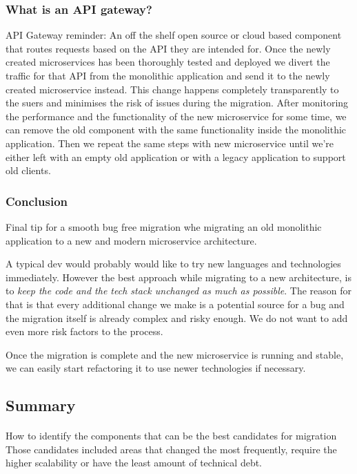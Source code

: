 \documentclass[a4paper, 11pt]{book}
\begin{document}
    \subsubsection{What is an API gateway?}
    API Gateway reminder: An off the shelf open source or cloud based component that routes requests based on the API they are intended for.
    Once the newly created microservices has been thoroughly tested and deployed we divert the traffic for that API from the monolithic application and send it to the newly created microservice instead.
    This change happens completely transparently to the suers and minimises the risk of issues during the migration.
    After monitoring the performance and the functionality of the new microservice for some time, we can remove the old component with the same functionality inside the monolithic application.
    Then we repeat the same steps with new microservice until we're either left with an empty old application or with a legacy application to support old clients.

    \subsubsection{Conclusion}
    Final tip for a smooth bug free migration whe migrating an old monolithic application to a new and modern microservice architecture.

    A typical dev would probably would like to try new languages and technologies immediately.
    However the best approach while migrating to a new architecture, is to \textit{keep the code and the tech stack unchanged as much as possible}.
    The reason for that is that every additional change we make is a potential source for a bug and the migration itself is already complex and risky enough.
    We do not want to add even more risk factors to the process.

    Once the migration is complete and the new microservice is running and stable, we can easily start refactoring it to use newer technologies if necessary.

    \subsection{Summary}

    \paragraph{}
    How to identify the components that can be the best candidates for migration
    Those candidates included areas that changed the most frequently, require the higher scalability or have the least amount of technical debt.
\end{document}
